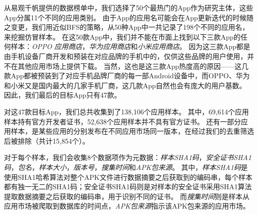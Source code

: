 从易观千帆提供的数据榜单中，我们选择了50个最热门的App作为研究主体，这些App分属11个不同的应用类别。
由于App的应用名可能会在App更新迭代的时候随之变更，我们用近似BFS的策略，从50种App中一共记录了198个不同的应用名，来挖掘仿冒样本。
在这50款App中，我们并不能在市面上找到以下三款App的任何样本：\emph{OPPO 应用商店}，\emph{华为应用商店}和\emph{小米应用商店}。
因为这三款App都是由手机设备厂商开发和预装在对应品牌的手机中的，仅供这些品牌的用户使用，并不在其他应用市场上提供下载。
当然，这也是这三款App热度高的原因——这几款App都被预装到了对应手机品牌厂商的每一部Android设备中，而OPPO、华为和小米又是国内最大的几家手机厂商，这几款App自然也会有庞大的用户基数。
因此，我们最后的目标App只有47款。

对这47款目标App，我们总共收集到了138,106个应用样本。
其中，69,614个应用样本持有官方开发者证书，52,638个应用样本并不具有官方证书。
还有一部分应用样本，是某些应用的分别发布在不同应用市场同一版本，在经过我们的去重筛选后被排除（共计15,854个）。

对于每个样本，我们会收集8个数据项作为元数据：\emph{样本SHA1码}，\emph{安全证书SHA1码}，\emph{包名}，\emph{样本大小}，\emph{版本号}，\emph{搜集时间}和\emph{APK包来源}。
其中，\emph{样本SHA1码}是使用SHA1哈希算法对整个APK文件进行数据摘要之后获取到的编码串，每个样本都有独一无二的SHA1码；安全证书SHA1码则是对样本的安全证书采用SHA1算法提取数据摘要之后获取的编码串，用于识别不同的证书。
而\emph{搜集时间}则是样本从应用市场被爬取到数据库的时间点，\emph{APK包来源}指示该APK包来源的应用市场。

